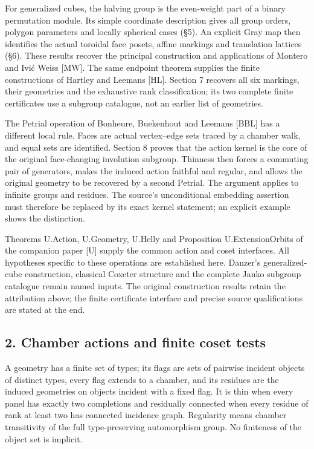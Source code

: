 \documentclass[
  11pt,
  a4paper,
]{article}
\begin{document}
For generalized cubes, the halving group is the even-weight part of a
binary permutation module. Its simple coordinate description gives all
group orders, polygon parameters and locally spherical cases (§5). An
explicit Gray map then identifies the actual toroidal face posets,
affine markings and translation lattices (§6). These results recover the
principal construction and applications of Montero and Ivić Weiss
{[}MW{]}. The same endpoint theorem supplies the finite constructions of
Hartley and Leemans {[}HL{]}. Section 7 recovers all six markings, their
geometries and the exhaustive rank classification; its two complete
finite certificates use a subgroup catalogue, not an earlier list of
geometries.

The Petrial operation of Bonheure, Buekenhout and Leemans {[}BBL{]} has
a different local rule. Faces are actual vertex--edge sets traced by a
chamber walk, and equal sets are identified. Section 8 proves that the
action kernel is the core of the original face-changing involution
subgroup. Thinness then forces a commuting pair of generators, makes the
induced action faithful and regular, and allows the original geometry to
be recovered by a second Petrial. The argument applies to infinite
groups and residues. The source's unconditional embedding assertion must
therefore be replaced by its exact kernel statement; an explicit example
shows the distinction.

Theorems U.Action, U.Geometry, U.Helly and Proposition U.ExtensionOrbits
of the companion paper {[}U{]} supply the common action and coset
interfaces. All hypotheses specific to these operations are established
here. Danzer's generalized-cube construction, classical Coxeter
structure and the complete Janko subgroup catalogue remain named inputs.
The original construction results retain the attribution above; the
finite certificate interface and precise source qualifications are
stated at the end.

\subsection{2. Chamber actions and finite coset
tests}\label{chamber-actions-and-finite-coset-tests}

A geometry has a finite set of types; its flags are sets of pairwise
incident objects of distinct types, every flag extends to a chamber, and
its residues are the induced geometries on objects incident with a fixed
flag. It is thin when every panel has exactly two completions and
residually connected when every residue of rank at least two has
connected incidence graph. Regularity means chamber transitivity of the
full type-preserving automorphism group. No finiteness of the object set
is implicit.
\end{document}
